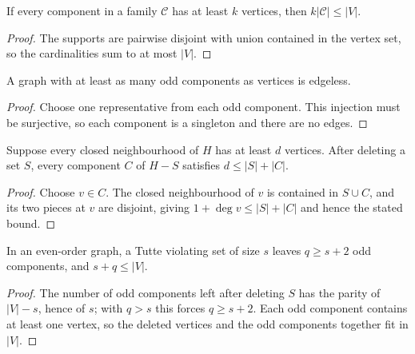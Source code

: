 \begin{lemma}
  \label{lem:count-components}
  \leanok
  If every component in a family $\mathcal{C}$ has at least $k$ vertices, then
  $k |\mathcal{C}| \le |V|$.
\end{lemma}
\begin{proof}
  The supports are pairwise disjoint with union contained in the vertex set, so the
  cardinalities sum to at most $|V|$.
\end{proof}

\begin{lemma}
  \label{lem:singleton-components}
  \leanok
  A graph with at least as many odd components as vertices is edgeless.
\end{lemma}
\begin{proof}
  Choose one representative from each odd component. This injection must be surjective, so
  each component is a singleton and there are no edges.
\end{proof}

\begin{lemma}
  \label{lem:component-size-deletion}
  \leanok
  Suppose every closed neighbourhood of $H$ has at least $d$ vertices. After deleting a
  set $S$, every component $C$ of $H - S$ satisfies $d \le |S| + |C|$.
\end{lemma}
\begin{proof}
  Choose $v \in C$. The closed neighbourhood of $v$ is contained in $S \cup C$, and its
  two pieces at $v$ are disjoint, giving $1 + \deg v \le |S| + |C|$ and hence the stated
  bound.
\end{proof}

\begin{lemma}
  \label{lem:violator-counts}
  \leanok
  In an even-order graph, a Tutte violating set of size $s$ leaves $q \ge s + 2$ odd
  components, and $s + q \le |V|$.
\end{lemma}
\begin{proof}
  The number of odd components left after deleting $S$ has the parity of $|V| - s$, hence
  of $s$; with $q > s$ this forces $q \ge s + 2$. Each odd component contains at least one
  vertex, so the deleted vertices and the odd components together fit in $|V|$.
\end{proof}


